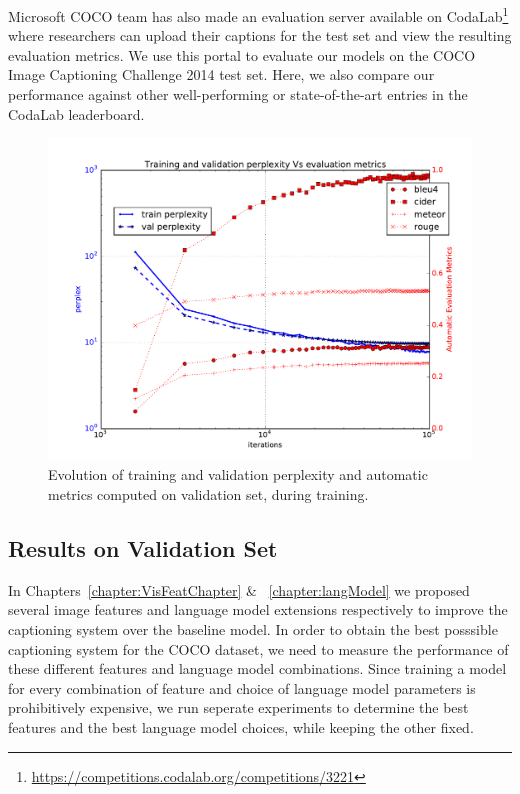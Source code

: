 Microsoft COCO team has also made an evaluation server available on
CodaLab\footnote{\url{https://competitions.codalab.org/competitions/3221}} where
researchers can upload their captions for the test set and view the resulting
evaluation metrics.
We use this portal to evaluate our models on the COCO Image Captioning Challenge
2014 test set. 
Here, we also compare our performance against other well-performing or
state-of-the-art entries in the CodaLab leaderboard.
\begin{figure}[ht]
\begin{center}
  \includegraphics[width=0.7\linewidth]{images/MetVsPerplex.pdf}
\end{center}
\vspace*{-10mm}
\caption{Evolution of training and validation perplexity and automatic metrics
        computed on validation set, during training.}
\label{fig:MetVsPerplex}
\end{figure}

\subsection{Results on Validation Set}
In Chapters~\ref{chapter:VisFeatChapter} \& ~\ref{chapter:langModel} we proposed
several image features and language model extensions respectively to improve the
captioning system over the baseline model.
In order to obtain the best posssible captioning system for the COCO dataset, we
need to measure the performance of these different features and language model
combinations.
Since training a model for every combination of feature and choice of language
model parameters is prohibitively expensive, we run seperate experiments to
determine the best features and the best language model choices, while keeping
the other fixed.
